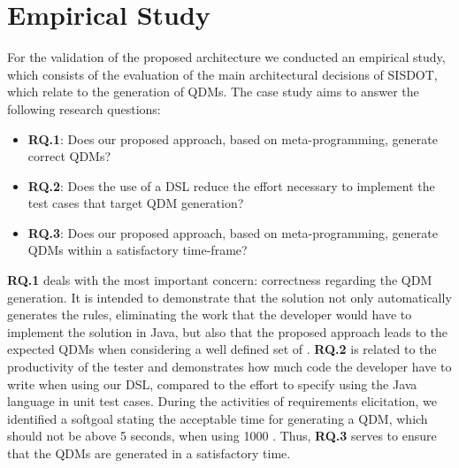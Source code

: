 \section{Empirical Study}
\label{sec:case_study} 


For the validation of the proposed architecture we conducted an empirical study,
which consists of the evaluation of the main 
architectural decisions of SISDOT, which relate to the generation of QDMs.
The case study aims to answer the 
following research questions:

\begin{itemize}

\item \textbf{RQ.1}: Does our proposed approach, based on meta-programming, generate correct QDMs?

\item \textbf{RQ.2}: Does the use of a DSL reduce the effort necessary to implement the test cases that target QDM generation? 

\item \textbf{RQ.3}: Does our proposed approach, based on meta-programming, generate QDMs within a satisfactory time-frame?

\end{itemize}


\textbf{RQ.1} deals with the most important concern: correctness regarding the QDM generation. It is intended 
to demonstrate that the solution not only automatically generates the rules, eliminating the work that the developer 
would have to implement the solution in Java, but also that the proposed approach leads to the expected QDMs when considering 
a well defined set of \callers.
\textbf{RQ.2} is related to the productivity of the tester and demonstrates how much code the 
developer have to write when using our DSL, compared to the effort to specify \callers using the Java language in 
unit test cases. During the activities of requirements elicitation,
we identified a softgoal stating the  acceptable time for generating a QDM, 
which should not be above 5 seconds, when using 1000 \callers.
Thus, \textbf{RQ.3} serves to ensure that the QDMs are generated in a satisfactory time.

